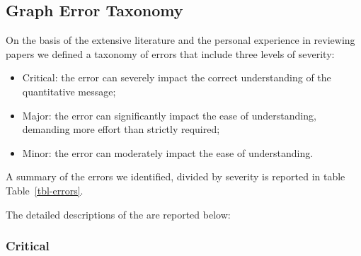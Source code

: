 \documentclass[
  10pt,
  conference,
]{IEEEtran}%
\providecommand{\tightlist}{%
  \setlength{\itemsep}{0pt}\setlength{\parskip}{0pt}}
\begin{document}
\subsection{Graph Error Taxonomy}\label{sec-error-taxonomy}

On the basis of the extensive literature and the personal experience in
reviewing papers we defined a taxonomy of errors that include three
levels of severity:

\begin{itemize}
\tightlist
\item
  Critical: the error can severely impact the correct understanding of
  the quantitative message;
\item
  Major: the error can significantly impact the ease of understanding,
  demanding more effort than strictly required;
\item
  Minor: the error can moderately impact the ease of understanding.
\end{itemize}

A summary of the errors we identified, divided by severity is reported
in table Table~\ref{tbl-errors}.

\begin{table}

\caption{\label{tbl-errors}Summary of errors by severity level.}


\end{table}%

The detailed descriptions of the are reported below:

\subsubsection{Critical}\label{critical}
\end{document}
